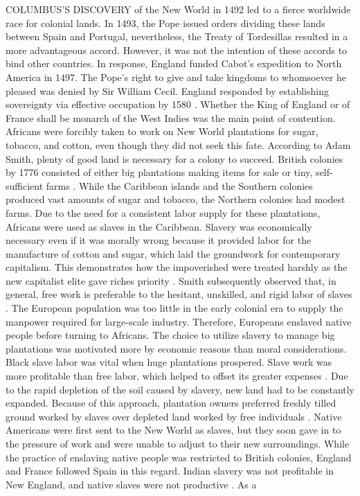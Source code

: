 COLUMBUS'S DISCOVERY of the New World in 1492 led to a fierce worldwide race for colonial lands. In 1493, the Pope issued orders dividing these lands between Spain and Portugal, nevertheless, the Treaty of Tordesillas resulted in a more advantageous accord. However, it was not the intention of these accords to bind other countries. In response, England funded Cabot's expedition to North America in 1497. The Pope's right to give and take kingdoms to whomsoever he pleased was denied by Sir William Cecil. England responded by establishing sovereignty via effective occupation by 1580 . Whether the King of England or of France shall be monarch of the West Indies  was the main point of contention. Africans were forcibly taken to work on New World plantations for sugar, tobacco, and cotton, even though they did not seek this fate. According to Adam Smith, plenty of good land  is necessary for a colony to succeed. British colonies by 1776 consisted of either big plantations making items for sale or tiny, self-sufficient farms . While the Caribbean islands and the Southern colonies produced vast amounts of sugar and tobacco, the Northern colonies had modest farms. Due to the need for a consistent labor supply for these plantations, Africans were used as slaves  in the Caribbean. Slavery was economically necessary even if it was morally wrong because it provided labor for the manufacture of cotton and sugar, which laid the groundwork for contemporary capitalism. This demonstrates how the impoverished were treated harshly as the new capitalist elite gave riches priority . Smith subsequently observed that, in general, free work is preferable to the hesitant, unskilled, and rigid labor of slaves . The European population was too little in the early colonial era to supply the manpower required for large-scale industry. Therefore, Europeans enslaved native people before turning to Africans. The choice to utilize slavery to manage big plantations was motivated more by economic reasons than moral considerations. Black slave labor was vital when huge plantations prospered. Slave work was more profitable than free labor, which helped to offset its greater expenses . Due to the rapid depletion of the soil caused by slavery, new land had to be constantly expanded. Because of this approach, plantation owners preferred freshly tilled ground worked by slaves over depleted land worked by free individuals . Native Americans were first sent to the New World as slaves, but they soon gave in to the pressure of work and were unable to adjust to their new surroundings. While the practice of enslaving native people was restricted to British colonies, England and France followed Spain in this regard. Indian slavery was not profitable in New England, and native slaves were not productive . As a 
